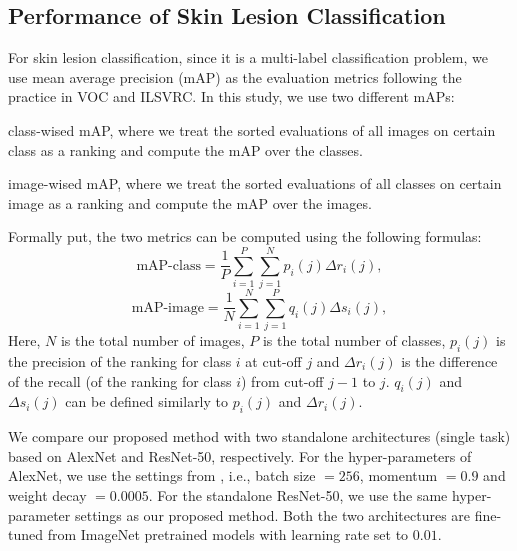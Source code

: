 \documentclass[letterpaper]{article}
\begin{document}
\subsection{Performance of Skin Lesion Classification}

For skin lesion classification, since it is a multi-label classification problem,
we use mean average precision (mAP) as the evaluation metrics following the practice
in VOC \cite{DBLP:journals/ijcv/EveringhamGWWZ10} and ILSVRC. In this study, we
use two different mAPs: 
\begin{inparaenum}[1)]
  \item class-wised mAP, where we treat the sorted evaluations of all images on
  certain class as a ranking and compute the mAP over the classes.
  \item image-wised mAP, where we treat the sorted evaluations of all classes on
  certain image as a ranking and compute the mAP over the images.
\end{inparaenum}
Formally put, the two metrics can be computed using the following formulas:
\begin{equation}
  \text{mAP-class} = \frac{1}{P}\sum_{i=1}^P\sum_{j=1}^Np_i(j)\Delta r_i(j),
\end{equation}
\begin{equation}
  \text{mAP-image} = \frac{1}{N}\sum_{i=1}^N\sum_{j=1}^Pq_i(j)\Delta s_i(j),
\end{equation}
Here, $N$ is the total number of images, $P$ is the total number of classes,
$p_i(j)$ is the precision of the ranking for class $i$ at cut-off $j$ and
$\Delta r_i(j)$ is the difference of the recall (of the ranking for class $i$) from
cut-off $j-1$ to $j$. $q_i(j)$ and $\Delta s_i(j)$ can be defined similarly to
$p_i(j)$ and $\Delta r_i(j)$. 

We compare our proposed method with two standalone architectures (single task) based
on AlexNet and ResNet-50, respectively. For the hyper-parameters of AlexNet, we use the settings
from \cite{DBLP:conf/nips/KrizhevskySH12}, i.e., batch size $= 256$, momentum $= 0.9$
and weight decay $= 0.0005$. For the standalone ResNet-50, we use the same hyper-parameter
settings as our proposed method. Both the two architectures are fine-tuned from ImageNet
pretrained models with learning rate set to $0.01$.
\end{document}
